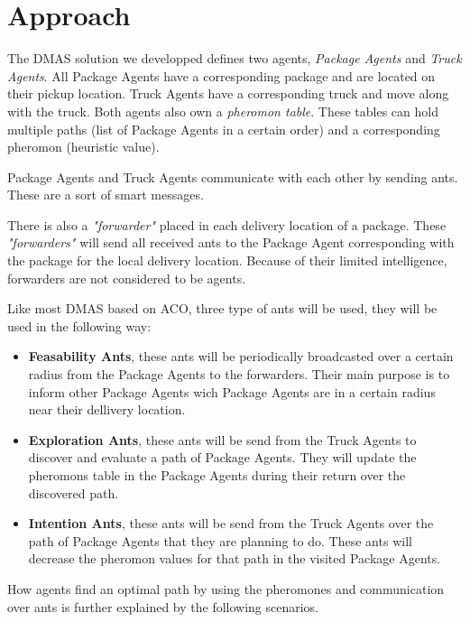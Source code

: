 \section{Approach}
\label{sec:approach}

The DMAS solution we developped defines two agents, \textit{Package Agents} and \textit{Truck Agents}. All Package Agents have a corresponding package and are located on their pickup location. Truck Agents have a corresponding truck and move along with the truck. Both agents also own a \textit{pheromon table}. These tables can hold multiple paths (list of Package Agents in a certain order) and a corresponding pheromon (heuristic value).

\npar Package Agents and Truck Agents communicate with each other by sending ants. These are a sort of smart messages.

\npar There is also a \textit{"forwarder"} placed in each delivery location of a package. These \textit{"forwarders"} will send all received ants to the Package Agent corresponding with the package for the local delivery location. Because of their limited intelligence, forwarders are not considered to be agents.

\npar Like most DMAS based on ACO, three type of ants will be used, they will be used in the following way:
\begin{itemize}

\item \textbf{Feasability Ants}, these ants will be periodically broadcasted over a certain radius from the Package Agents to the forwarders. Their main purpose is to inform other Package Agents wich Package Agents are in a certain radius near their dellivery location.

\item \textbf{Exploration Ants}, these ants will be send from the Truck Agents to discover and evaluate a path of Package Agents. They will update the pheromons table in the Package Agents during their return over the discovered path.

\item \textbf{Intention Ants}, these ants will be send from the Truck Agents over the path of Package Agents that they are planning to do. These ants will decrease the pheromon values for that path in the visited Package Agents.

\end{itemize}

\npar How agents find an optimal path by using the pheromones and communication over ants is further explained by the following scenarios.

